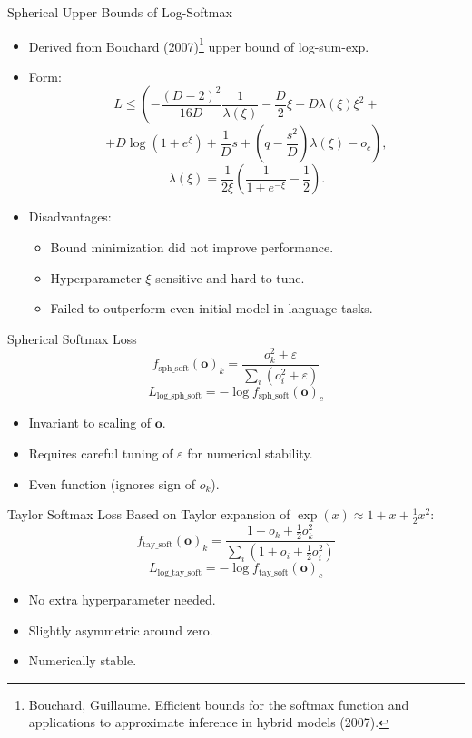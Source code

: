 \documentclass{beamer}
\begin{document}
\begin{frame}{Spherical Upper Bounds of Log-Softmax}
\begin{itemize}
    \item Derived from Bouchard (2007)\footnote{Bouchard, Guillaume. Efficient bounds for the softmax function and applications to approximate inference in hybrid models (2007).} upper bound of log-sum-exp.
    \item Form:
    \[
L \leq \left(-\frac{(D-2)^2}{16D}\frac{1}{\lambda(\xi)}-\frac{D}{2}\xi-D\lambda(\xi)\xi^2+\right.\] \[
\left.+D\log(1+e^{\xi})+
\frac{1}{D}s+\left(q-\frac{s^2}{D}\right)\lambda(\xi)-o_c\right),
\]
\[
\lambda(\xi)=\frac{1}{2\xi}\left(\frac{1}{1+e^{-\xi}}-\frac{1}{2}\right).
\]
    \item Disadvantages:
    \begin{itemize}
        \item Bound minimization did not improve performance.
        \item Hyperparameter $\xi$ sensitive and hard to tune.
        \item Failed to outperform even initial model in language tasks.
    \end{itemize}
\end{itemize}
\end{frame}


\begin{frame}{Spherical Softmax Loss}
\[
f_{\text{sph\_soft}}(\boldsymbol{o})_k = \frac{o_k^2 + \varepsilon}{\sum_i (o_i^2 + \varepsilon)}
\]
\[
L_{\text{log\_sph\_soft}} = -\log f_{\text{sph\_soft}}(\boldsymbol{o})_c
\]
\begin{itemize}
    \item Invariant to scaling of $\boldsymbol{o}$.
    \item Requires careful tuning of $\varepsilon$ for numerical stability.
    \item Even function (ignores sign of $o_k$).
\end{itemize}
\end{frame}

\begin{frame}{Taylor Softmax Loss}
Based on Taylor expansion of $\exp(x) \approx 1 + x + \frac{1}{2}x^2$:
\[
f_{\text{tay\_soft}}(\boldsymbol{o})_k = \frac{1 + o_k + \frac{1}{2}o_k^2}{\sum_i (1 + o_i + \frac{1}{2}o_i^2)}
\]
\[
L_{\text{log\_tay\_soft}} = -\log f_{\text{tay\_soft}}(\boldsymbol{o})_c
\]
\begin{itemize}
    \item No extra hyperparameter needed.
    \item Slightly asymmetric around zero.
    \item Numerically stable.
\end{itemize}
\end{frame}
\end{document}
